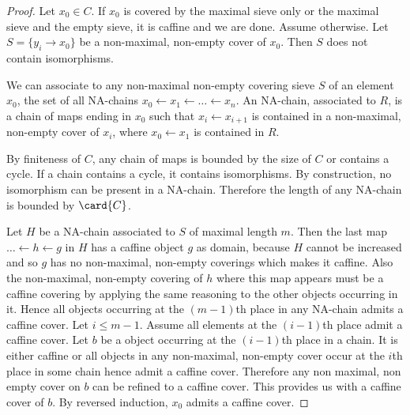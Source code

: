 \begin{proof}
Let $x_0\in C$. 
If $x_0$ is covered by the maximal sieve only or the maximal sieve and the empty sieve, it is caffine and we are done. 
Assume otherwise.
Let $S = \{y_i \rightarrow x_0\}$ be a non-maximal, non-empty cover of $x_0$.
Then $S$ does not contain isomorphisms.

We can associate to any non-maximal non-empty covering sieve $S$ of an element $x_0$,
the set of all NA-chains $x_0\leftarrow x_1 \leftarrow \ldots \leftarrow x_n$.
An NA-chain, associated to $R$, is a chain of maps ending in $x_0$ such that $x_i \leftarrow x_{i+1}$ is contained in a non-maximal, 
non-empty cover of $x_i$, where $x_0\leftarrow x_1$ is contained in $R$.

By finiteness of $C$, any chain of maps is bounded by the size of $C$ or contains a cycle. 
If a chain contains a cycle, it contains isomorphisms. 
By construction, no isomorphism can be present in a NA-chain. 
Therefore the length of any NA-chain is bounded by $\card{C}$.

Let $H$ be a NA-chain associated to $S$ of maximal length $m$. 
Then the last map $\ldots \leftarrow h \leftarrow g$ in $H$ has a caffine object $g$ as domain,
because $H$ cannot be increased and so $g$ has no non-maximal, non-empty coverings which makes it caffine.
Also the non-maximal, non-empty covering of $h$ where this map appears must be a caffine covering by applying the same reasoning to the other objects occurring in it. 
Hence all objects occurring at the $(m-1)$th place in any NA-chain admits a caffine cover.
Let $i\leq m-1$. Assume all elements at the $(i-1)$th place admit a caffine cover. 
Let $b$ be a object occurring at the $(i-1)$th place in a chain. It is either caffine or all objects in any non-maximal, non-empty cover occur at the $i$th place in some chain hence admit a caffine cover. Therefore any non maximal, non empty cover on $b$ can be refined to a caffine cover. This provides us with a caffine cover of $b$.
By reversed induction, $x_0$ admits a caffine cover.
\end{proof}